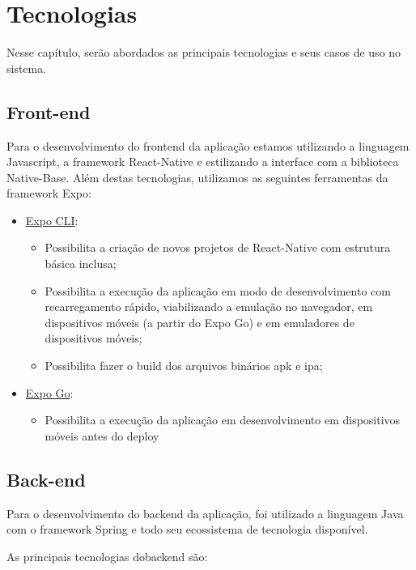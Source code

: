 \chapter{Tecnologias}

Nesse capítulo, serão abordados as principais tecnologias e seus casos de uso no sistema.

\section{Front-end}
Para o desenvolvimento do \gls{frontend} da aplicação estamos utilizando a linguagem Javascript, a \gls{framework} React-Native e estilizando a interface com a biblioteca Native-Base.
Além destas tecnologias, utilizamos as seguintes ferramentas da \gls{framework} Expo:

\begin{itemize}
	\item \underline{Expo CLI}:
		\begin{itemize}
			\item Possibilita a criação de novos projetos de React-Native com estrutura básica inclusa;
			\item Possibilita a execução da aplicação em modo de desenvolvimento com recarregamento rápido, viabilizando a emulação no navegador, em dispositivos móveis (a partir do Expo Go) e em emuladores de dispositivos móveis;
			
			\item Possibilita fazer o \gls{build} dos arquivos binários \gls{apk} e \gls{ipa};
		\end{itemize}
		
			\item \underline{Expo Go}:
		\begin{itemize}
			\item Possibilita a execução da aplicação em desenvolvimento em dispositivos móveis antes do \gls{deploy}
		\end{itemize}
\end{itemize}

\section{Back-end}
Para o desenvolvimento do \gls{backend} da aplicação, foi utilizado a linguagem Java com o \gls{framework} Spring e todo seu ecossistema de tecnologia disponível.

As principais tecnologias do\gls{backend} são:

